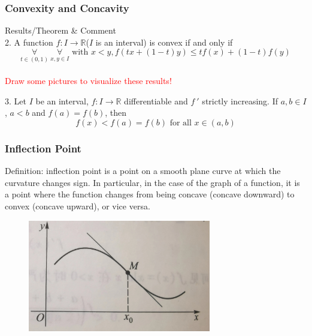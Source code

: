 \documentclass{beamer}
\begin{document}
\begin{frame}
    \frametitle{Convexity and Concavity}
    Results/Theorem \& Comment\\
    \vspace{1em}
    2. A function $f:I\rightarrow\mathbb{R}$($I$ is an interval) is convex if and only if
    \begin{equation*}
        \underset{t\in(0,1)}{\forall}\ \underset{x,y\in I}{\forall}\text{ with } x<y, f(tx+(1-t)y)\leq tf(x)+(1-t)f(y)
    \end{equation*}\\

    \textcolor{red}{Draw some pictures to visualize these results!}

    \vspace{2em}
    3. Let $I$ be an interval, $f:I\rightarrow\mathbb{R}$ differentiable and $f~'$ strictly increasing. If $a, b\in I$, $a<b$ and
    $f(a)=f(b)$, then
    \begin{equation*}
        f(x)<f(a)=f(b)\text{ for all }x\in(a,b)
    \end{equation*}

\end{frame}
\begin{frame}
    \frametitle{Inflection Point}
    Definition: inflection point is a point on a smooth plane curve at which the curvature changes sign. In particular, in the case of the graph of a function, it is a point where the function changes from being concave (concave downward) to convex (concave upward), or vice versa.
    \begin{figure}[htbp]
        \centering
        \includegraphics[width=8cm]{inflection.jpg}
    \end{figure}
\end{frame}
\end{document}
